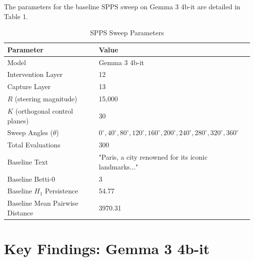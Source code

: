 \documentclass[11pt,a4paper,oneside]{scrbook}
\begin{document}
The parameters for the baseline SPPS sweep on Gemma 3 4b-it are detailed in Table 1.

\begin{table}[htbp]
\centering
\caption{SPPS Sweep Parameters}
\label{tab:sweep_parameters}
\begin{tabular}{ll}
\toprule
\textbf{Parameter} & \textbf{Value} \\
\midrule
Model & Gemma 3 4b-it \\
Intervention Layer & 12 \\
Capture Layer & 13 \\
$R$ (steering magnitude) & 15,000 \\
$K$ (orthogonal control planes) & 30 \\
Sweep Angles ($\theta$) & $0^{\circ}, 40^{\circ}, 80^{\circ}, 120^{\circ}, 160^{\circ}, 200^{\circ}, 240^{\circ}, 280^{\circ}, 320^{\circ}, 360^{\circ}$ \\
Total Evaluations & 300 \\
Baseline Text & "Paris, a city renowned for its iconic landmarks..." \\
Baseline Betti-0 & 3 \\
Baseline $H_1$ Persistence & 54.77 \\
Baseline Mean Pairwise Distance & 3970.31 \\
\bottomrule
\end{tabular}
\end{table}

\chapter{Key Findings: Gemma 3 4b-it}
\label{sec:findings_gemma3}
\end{document}
